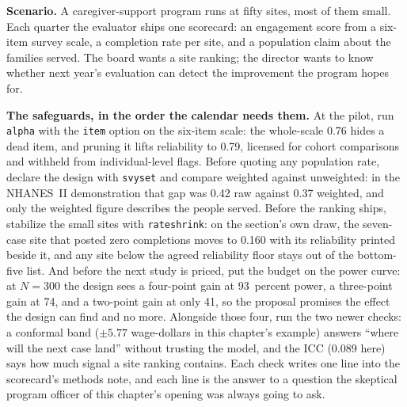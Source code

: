 \documentclass[
    a4paper,
    fontsize=10pt,
    twoside=true,
    numbers=noenddot,
]{kaobook}
\newcounter{appliedexample}
\newenvironment{appliedexample}[1][]{%
    \refstepcounter{appliedexample}%
    \begin{appliedexamplebox}[frametitle={Applied Example~\theappliedexample.~~#1}]%
}{%
    \end{appliedexamplebox}%
}
\begin{document}
\begin{appliedexample}[One quarterly scorecard, four safeguards]\label{ae:ch07-scorecard}
\textbf{Scenario.} A caregiver-support program runs at fifty sites, most of them small. Each quarter the evaluator ships one scorecard: an engagement score from a six-item survey scale, a completion rate per site, and a population claim about the families served. The board wants a site ranking; the director wants to know whether next year's evaluation can detect the improvement the program hopes for.

\medskip
\textbf{The safeguards, in the order the calendar needs them.} At the pilot, run \texttt{alpha} with the \texttt{item} option on the six-item scale: the whole-scale 0.76 hides a dead item, and pruning it lifts reliability to 0.79, licensed for cohort comparisons and withheld from individual-level flags. Before quoting any population rate, declare the design with \texttt{svyset} and compare weighted against unweighted: in the NHANES~II demonstration that gap was 0.42 raw against 0.37 weighted, and only the weighted figure describes the people served. Before the ranking ships, stabilize the small sites with \texttt{rateshrink}: on the section's own draw, the seven-case site that posted zero completions moves to 0.160 with its reliability printed beside it, and any site below the agreed reliability floor stays out of the bottom-five list. And before the next study is priced, put the budget on the power curve: at $N=300$ the design sees a four-point gain at 93~percent power, a three-point gain at 74, and a two-point gain at only 41, so the proposal promises the effect the design can find and no more. Alongside those four, run the two newer checks: a conformal band ($\pm 5.77$ wage-dollars in this chapter's example) answers \enquote{where will the next case land} without trusting the model, and the ICC (0.089 here) says how much signal a site ranking contains. Each check writes one line into the scorecard's methods note, and each line is the answer to a question the skeptical program officer of this chapter's opening was always going to ask.
\end{appliedexample}
\end{document}
